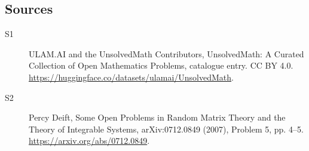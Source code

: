 \documentclass[11pt]{article}
\begin{document}
\subsection{Sources}
\begin{description}
\item[\hypertarget{source:statement:1}{S1}] ULAM.AI and the UnsolvedMath Contributors, UnsolvedMath: A Curated Collection of Open Mathematics Problems, catalogue entry. CC BY 4.0. \url{https://huggingface.co/datasets/ulamai/UnsolvedMath}.
\item[\hypertarget{source:statement:2}{S2}] Percy Deift, Some Open Problems in Random Matrix Theory and the Theory of Integrable Systems, arXiv:0712.0849 (2007), Problem 5, pp. 4--5. \url{https://arxiv.org/abs/0712.0849}.
\end{description}
\label{end:statement}
\end{document}
